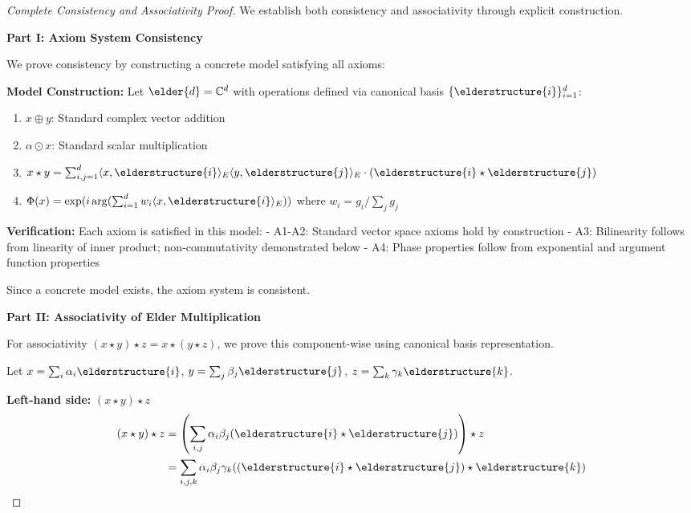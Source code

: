 \begin{proof}[Complete Consistency and Associativity Proof]
We establish both consistency and associativity through explicit construction.

\textbf{Part I: Axiom System Consistency}

We prove consistency by constructing a concrete model satisfying all axioms:

\textbf{Model Construction:} Let $\elder{d} = \mathbb{C}^d$ with operations defined via canonical basis $\{\elderstructure{i}\}_{i=1}^d$:
\begin{enumerate}
    \item $x \oplus y$: Standard complex vector addition
    \item $\alpha \odot x$: Standard scalar multiplication
    \item $x \star y = \sum_{i,j=1}^{d} \langle x, \elderstructure{i} \rangle_E \langle y, \elderstructure{j} \rangle_E \cdot (\elderstructure{i} \star \elderstructure{j})$
    \item $\Phi(x) = \exp(i \arg(\sum_{i=1}^{d} w_i \langle x, \elderstructure{i} \rangle_E))$ where $w_i = g_i/\sum_j g_j$
\end{enumerate}

\textbf{Verification:} Each axiom is satisfied in this model:
- A1-A2: Standard vector space axioms hold by construction
- A3: Bilinearity follows from linearity of inner product; non-commutativity demonstrated below
- A4: Phase properties follow from exponential and argument function properties

Since a concrete model exists, the axiom system is consistent.

\textbf{Part II: Associativity of Elder Multiplication}

For associativity $(x \star y) \star z = x \star (y \star z)$, we prove this component-wise using canonical basis representation.

Let $x = \sum_{i} \alpha_i \elderstructure{i}$, $y = \sum_{j} \beta_j \elderstructure{j}$, $z = \sum_{k} \gamma_k \elderstructure{k}$.

\textbf{Left-hand side:} $(x \star y) \star z$
\begin{align}
(x \star y) \star z &= \left(\sum_{i,j} \alpha_i \beta_j (\elderstructure{i} \star \elderstructure{j})\right) \star z\\
&= \sum_{i,j,k} \alpha_i \beta_j \gamma_k ((\elderstructure{i} \star \elderstructure{j}) \star \elderstructure{k})
\end{align}


\end{proof}
